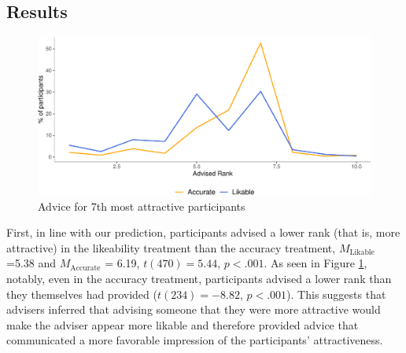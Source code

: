 \documentclass[
  man,floatsintext]{apa6}
\begin{document}
\hypertarget{results-1}{%
\subsection{Results}\label{results-1}}

\begin{figure}

{\centering \includegraphics{Advice-Giving_files/figure-latex/study2advice-1} 

}

\caption{Advice for 7th most attractive participants}\label{fig:study2advice}
\end{figure}

First, in line with our prediction, participants advised a lower rank (that is, more attractive) in the likeability treatment than the accuracy treatment, \(M_{\text{Likable}}\) =5.38 and \(M_{\text{Accurate}}\) = 6.19, \(t(470) = 5.44\), \(p < .001\). As seen in Figure \ref{fig:study2advice}, notably, even in the accuracy treatment, participants advised a lower rank than they themselves had provided (\(t(234) = -8.82\), \(p < .001\)). This suggests that advisers inferred that advising someone that they were more attractive would make the adviser appear more likable and therefore provided advice that communicated a more favorable impression of the participants' attractiveness.

\begin{table}

\caption{\label{tab:study2regs}When individuals receive advice that implies a high level of attractiveness (lower rank), they tend to perceive the advice giver as more likable (Column 1) and warm (Column 2).}
\centering
{}
\end{table}
\end{document}
